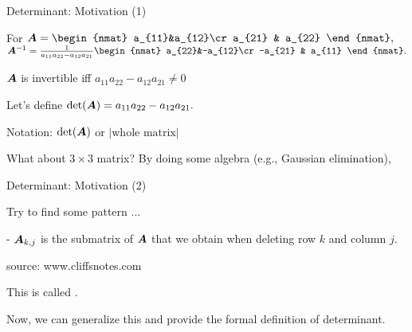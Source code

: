 \documentclass[handout,fleqn,aspectratio=169]{beamer}
\begin{document}
\begin{frame}{Determinant: Motivation (1)}

\plitemsep 0.1in

\bci 
\item For $\mat{A} = 
\begin{nmat}
a_{11}&a_{12}\cr
a_{21} & a_{22}
\end{nmat},
$
$\inv{\mat{A}} =\frac{1}{a_{11}a_{22} - a_{12}a_{21}}
\begin{nmat}
a_{22}&-a_{12}\cr
-a_{21} & a_{11}
\end{nmat}.
$

\item $\bm{A}$ is invertible iff $a_{11}a_{22} - a_{12}a_{21} \neq 0$

\item  Let's define $\det(\bm{A}) = a_{11}a_{22} - a_{12}a_{21}.$

\item Notation: $\det(\bm{A})$ or $|\text{whole matrix}|$

\item What about $3 \times 3$ matrix? By doing some algebra (e.g., Gaussian elimination), 
\eci
\end{frame}

\begin{frame}{Determinant: Motivation (2)}

\plitemsep 0.1in

\bci 
\item Try to find some pattern ... 

{

- $\bm{A}_{k,j}$ is the submatrix of $\bm{A}$ that we obtain when deleting row $k$ and column $j.$
}
{
\centering
{}
{\scriptsize source: www.cliffsnotes.com}
}

\item This is called .

\item Now, we can generalize this and provide the formal definition of determinant. 

\eci
\end{frame}
\end{document}
